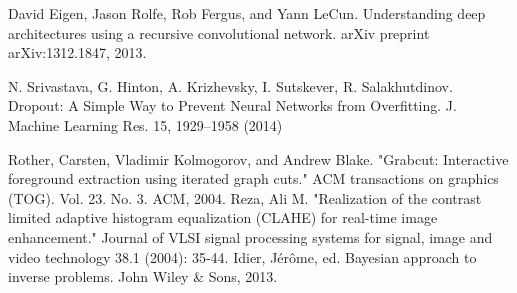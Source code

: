 \documentclass[journal, 10pt]{IEEEtran}
\begin{document}
\begin{thebibliography}{1}
    David Eigen, Jason Rolfe, Rob Fergus, and Yann LeCun. Understanding deep architectures using a recursive convolutional network. arXiv preprint arXiv:1312.1847, 2013.

    N. Srivastava, G. Hinton, A. Krizhevsky, I. Sutskever, R. Salakhutdinov. Dropout: A Simple Way to Prevent Neural Networks from Overfitting. J. Machine Learning Res. 15, 1929–1958 (2014)

    Rother, Carsten, Vladimir Kolmogorov, and Andrew Blake. "Grabcut: Interactive foreground extraction using iterated graph cuts." ACM transactions on graphics (TOG). Vol. 23. No. 3. ACM, 2004.
    Reza, Ali M. "Realization of the contrast limited adaptive histogram equalization (CLAHE) for real-time image enhancement." Journal of VLSI signal processing systems for signal, image and video technology 38.1 (2004): 35-44.
    Idier, Jérôme, ed. Bayesian approach to inverse problems. John Wiley \& Sons, 2013.
\end{thebibliography}

%






\end{document}
